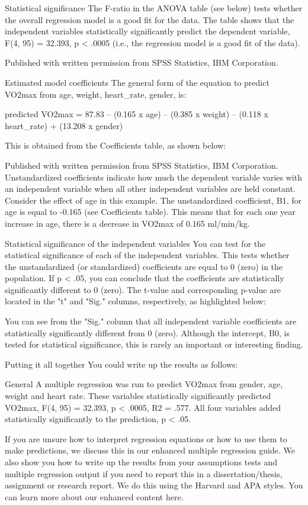 \documentclass[]{article}
\begin{document}
		Statistical significance
		The F-ratio in the ANOVA table (see below) tests whether the overall regression model is a good fit for the data. The table shows that the independent variables statistically significantly predict the dependent variable, F(4, 95) = 32.393, p < .0005 (i.e., the regression model is a good fit of the data).
		
		
		Published with written permission from SPSS Statistics, IBM Corporation.
		
		
		Estimated model coefficients
		The general form of the equation to predict VO2max from age, weight, heart\_rate, gender, is:
		
		predicted VO2max = 87.83 – (0.165 x age) – (0.385 x weight) – (0.118 x heart\_rate) + (13.208 x gender)
		
		This is obtained from the Coefficients table, as shown below:
		
		
		Published with written permission from SPSS Statistics, IBM Corporation.
		Unstandardized coefficients indicate how much the dependent variable varies with an independent variable when all other independent variables are held constant. Consider the effect of age in this example. The unstandardized coefficient, B1, for age is equal to -0.165 (see Coefficients table). This means that for each one year increase in age, there is a decrease in VO2max of 0.165 ml/min/kg.
		
		Statistical significance of the independent variables
		You can test for the statistical significance of each of the independent variables. This tests whether the unstandardized (or standardized) coefficients are equal to 0 (zero) in the population. If p < .05, you can conclude that the coefficients are statistically significantly different to 0 (zero). The t-value and corresponding p-value are located in the "t" and "Sig." columns, respectively, as highlighted below:
		
		
		You can see from the "Sig." column that all independent variable coefficients are statistically significantly different from 0 (zero). Although the intercept, B0, is tested for statistical significance, this is rarely an important or interesting finding.
		
		Putting it all together
		You could write up the results as follows:
		
		General
		A multiple regression was run to predict VO2max from gender, age, weight and heart rate. These variables statistically significantly predicted VO2max, F(4, 95) = 32.393, p < .0005, R2 = .577. All four variables added statistically significantly to the prediction, p < .05.
		
		If you are unsure how to interpret regression equations or how to use them to make predictions, we discuss this in our enhanced multiple regression guide. We also show you how to write up the results from your assumptions tests and multiple regression output if you need to report this in a dissertation/thesis, assignment or research report. We do this using the Harvard and APA styles. You can learn more about our enhanced content here.
		
	
\end{document}
